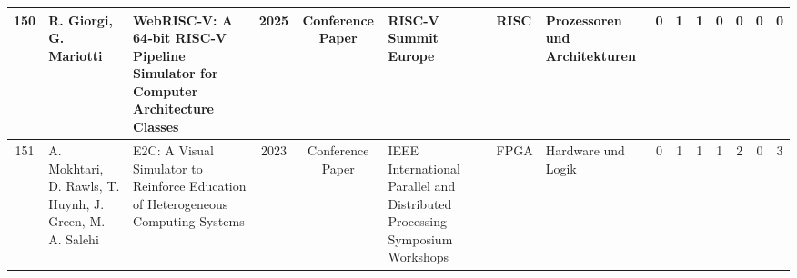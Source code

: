 \begin{landscape}
\begin{longtable}{|c|p{2cm}|p{2cm}|c|c|p{2cm}|p{1cm}|p{1cm}|c|c|c|c|c|c|c|}
    150 & R. Giorgi, G. Mariotti & WebRISC‑V: A 64‑bit RISC‑V Pipeline Simulator for Computer Architecture Classes & 2025 & Conference Paper & RISC-V Summit Europe & RISC & Prozessoren und Architekturen & 0 & 1 & 1 & 0 & 0 & 0 & 0 \\ \hline
    151 & A. Mokhtari, D. Rawls, T. Huynh, J. Green, M. A. Salehi & E2C: A Visual Simulator to Reinforce Education of Heterogeneous Computing Systems & 2023 & Conference Paper & IEEE International Parallel and Distributed Processing Symposium Workshops & FPGA & Hardware und Logik & 0 & 1 & 1 & 1 & 2 & 0 & 3 \\ \hline
\end{longtable}
\end{landscape}
